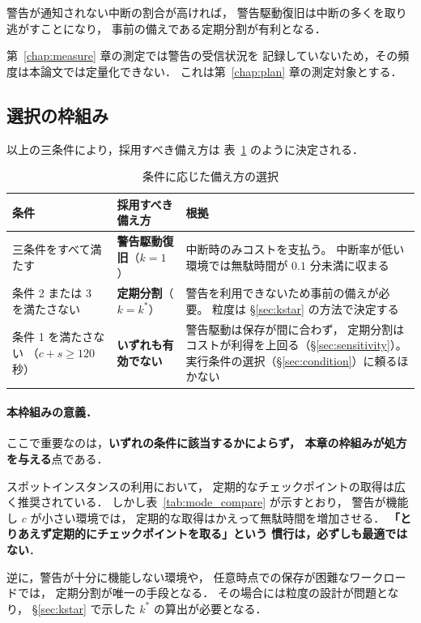 \documentclass[11pt,a4paper]{ltjsreport}
\begin{document}
警告が通知されない中断の割合が高ければ，
警告駆動復旧は中断の多くを取り逃がすことになり，
事前の備えである定期分割が有利となる．

第~\ref{chap:measure} 章の測定では警告の受信状況を
記録していないため，その頻度は本論文では定量化できない．
これは第~\ref{chap:plan} 章の測定対象とする．

\subsection{選択の枠組み}
\label{sec:split_role}

以上の三条件により，採用すべき備え方は
表~\ref{tab:strategy_role} のように決定される．

\begin{table}[htbp]
\centering
\caption{条件に応じた備え方の選択}
\label{tab:strategy_role}
\small
\begin{tabularx}{\textwidth}{@{}lXX@{}}
\toprule
条件 & 採用すべき備え方 & 根拠 \\
\midrule
三条件をすべて満たす
  & \textbf{警告駆動復旧}（$k=1$）
  & 中断時のみコストを支払う。
    中断率が低い環境では無駄時間が $0.1$ 分未満に収まる \\
\addlinespace
条件 2 または 3 を満たさない
  & \textbf{定期分割}（$k = k^{*}$）
  & 警告を利用できないため事前の備えが必要。
    粒度は \S\ref{sec:kstar} の方法で決定する \\
\addlinespace
条件 1 を満たさない
  （$c + s \geq 120$ 秒）
  & \textbf{いずれも有効でない}
  & 警告駆動は保存が間に合わず，
    定期分割はコストが利得を上回る（\S\ref{sec:sensitivity}）。
    実行条件の選択（\S\ref{sec:condition}）に頼るほかない \\
\bottomrule
\end{tabularx}
\end{table}

\paragraph{本枠組みの意義．}
ここで重要なのは，\textbf{いずれの条件に該当するかによらず，
本章の枠組みが処方を与える}点である．

スポットインスタンスの利用において，
定期的なチェックポイントの取得は広く推奨されている．
しかし表~\ref{tab:mode_compare} が示すとおり，
警告が機能し $c$ が小さい環境では，
定期的な取得はかえって無駄時間を増加させる．
\textbf{「とりあえず定期的にチェックポイントを取る」という
慣行は，必ずしも最適ではない}．

逆に，警告が十分に機能しない環境や，
任意時点での保存が困難なワークロードでは，
定期分割が唯一の手段となる．
その場合には粒度の設計が問題となり，
\S\ref{sec:kstar} で示した $k^{*}$ の算出が必要となる．
\end{document}
